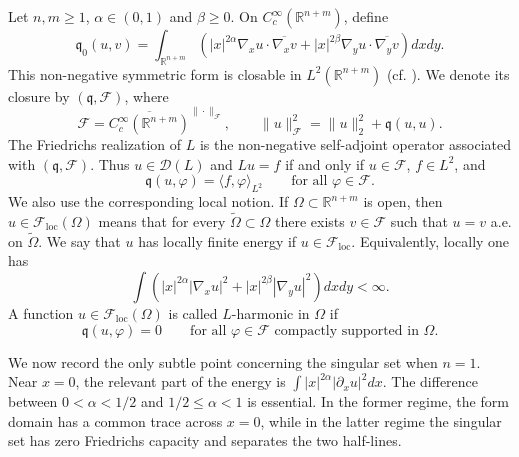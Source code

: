 \documentclass[12pt]{amsart}
\begin{document}
Let $n,m\ge 1$, $\alpha\in (0,1)$ and $\beta \ge 0$. On
$C_c^\infty(\mathbb R^{n+m})$, define
\begin{equation*}
    \mathfrak q_0(u,v)
    =
    \int_{\mathbb R^{n+m}}
    \left(
        |x|^{2\alpha}\nabla_xu\cdot \overline{\nabla_xv}
        +
        |x|^{2\beta}\nabla_yu\cdot \overline{\nabla_yv}
    \right)dxdy.
\end{equation*}
This non-negative symmetric form is closable in $L^2(\mathbb R^{n+m})$ (cf. \cite[Lemma~2.1]{RS}). We denote its
closure by $(\mathfrak q,\mathcal F)$, where
\begin{equation*}
    \mathcal F
    =
    \overline{C_c^\infty(\mathbb R^{n+m})}^{\|\cdot\|_{\mathcal F}},
    \qquad
    \|u\|_{\mathcal F}^2
    =
    \|u\|_2^2+\mathfrak q(u,u).
\end{equation*}
The Friedrichs realization of $L$ is the non-negative self-adjoint operator associated
with $(\mathfrak q,\mathcal F)$. Thus $u\in\mathcal D(L)$ and $Lu=f$ if and only if
$u\in\mathcal F$, $f\in L^2$, and
\begin{equation*}
    \mathfrak q (u,\varphi)=\langle f,\varphi\rangle_{L^2}
    \qquad
    \text{for all }\varphi\in\mathcal F.
\end{equation*}
We also use the corresponding local notion. If $\Omega\subset\mathbb R^{n+m}$ is open, then $u\in\mathcal F_{\mathrm{loc}}(\Omega)$ means that for every $\widetilde{\Omega} \subset\Omega$ there exists $v\in\mathcal F$ such that $u=v$ a.e. on $\widetilde{\Omega}$. We say that $u$ has locally finite energy if $u\in\mathcal F_{\mathrm{loc}}$.
Equivalently, locally one has
\begin{equation*}
    \int
    \left(
        |x|^{2\alpha}|\nabla_xu|^2
        +
        |x|^{2\beta}|\nabla_yu|^2
    \right)dxdy
    <\infty.
\end{equation*}
A function $u\in\mathcal F_{\mathrm{loc}}(\Omega)$ is called $L$-harmonic in $\Omega$ if
\begin{equation}
    \mathfrak q(u,\varphi)=0
    \qquad
    \text{for all }\varphi\in\mathcal F
    \text{ compactly supported in }\Omega.
\end{equation}

We now record the only subtle point concerning the singular set when $n=1$. Near $x=0$, the relevant part of the energy is $\int |x|^{2\alpha}|\partial_xu|^2dx$. The difference between $0<\alpha<1/2$ and $1/2 \le \alpha<1$ is essential. In the former regime, the form domain has a common trace across $x=0$, while in the latter regime the singular set has zero Friedrichs capacity and separates the two half-lines.
\end{document}
